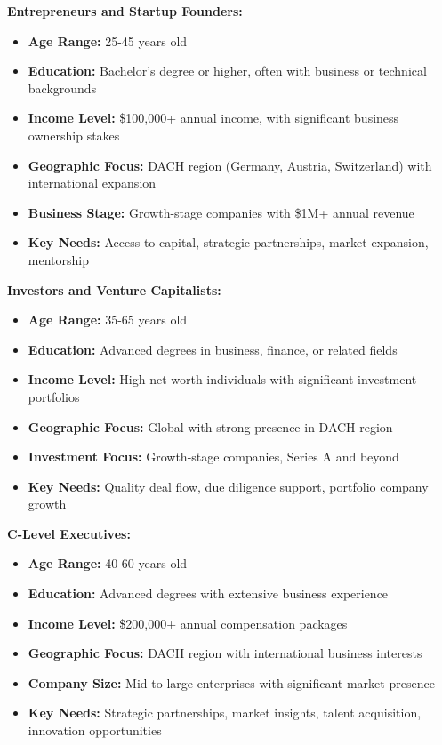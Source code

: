 \textbf{Entrepreneurs and Startup Founders:}
\begin{itemize}
    \item \textbf{Age Range:} 25-45 years old
    \item \textbf{Education:} Bachelor's degree or higher, often with business or technical backgrounds
    \item \textbf{Income Level:} \$100,000+ annual income, with significant business ownership stakes
    \item \textbf{Geographic Focus:} DACH region (Germany, Austria, Switzerland) with international expansion
    \item \textbf{Business Stage:} Growth-stage companies with \$1M+ annual revenue
    \item \textbf{Key Needs:} Access to capital, strategic partnerships, market expansion, mentorship
\end{itemize}

\textbf{Investors and Venture Capitalists:}
\begin{itemize}
    \item \textbf{Age Range:} 35-65 years old
    \item \textbf{Education:} Advanced degrees in business, finance, or related fields
    \item \textbf{Income Level:} High-net-worth individuals with significant investment portfolios
    \item \textbf{Geographic Focus:} Global with strong presence in DACH region
    \item \textbf{Investment Focus:} Growth-stage companies, Series A and beyond
    \item \textbf{Key Needs:} Quality deal flow, due diligence support, portfolio company growth
\end{itemize}

\textbf{C-Level Executives:}
\begin{itemize}
    \item \textbf{Age Range:} 40-60 years old
    \item \textbf{Education:} Advanced degrees with extensive business experience
    \item \textbf{Income Level:} \$200,000+ annual compensation packages
    \item \textbf{Geographic Focus:} DACH region with international business interests
    \item \textbf{Company Size:} Mid to large enterprises with significant market presence
    \item \textbf{Key Needs:} Strategic partnerships, market insights, talent acquisition, innovation opportunities
\end{itemize}

